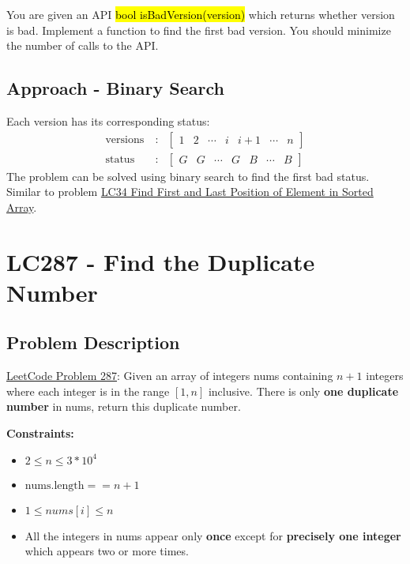 \documentclass[justified]{tufte-book}
\begin{document}
You are given an API \hl{bool isBadVersion(version)} which returns whether version is bad. Implement a function to find the first bad version. You should minimize the number of calls to the API.

\subsection{Approach - Binary Search}
Each version has its corresponding status:
\begin{eqnarray*}
    \text{versions} ~ &:& \begin{bmatrix} 1 & 2 & \cdots & i & i+1 & \cdots & n \end{bmatrix} \\
    \text{status} ~ &:& \begin{bmatrix} G & G & \cdots & G & B & \cdots & B \end{bmatrix}
\end{eqnarray*}
The problem can be solved using binary search to find the first bad status. Similar to problem \hyperref[sec:lc34_find_first_last_position_sorted_array]{LC34 Find First and Last Position of Element in Sorted Array}.

\section{LC287 - Find the Duplicate Number} \label{sec:lc287_find_duplicate_number}
\subsection{Problem Description}
\href{https://leetcode.com/problems/find-the-duplicate-number/}{LeetCode Problem 287}: Given an array of integers nums containing $n + 1$ integers where each integer is in the range $[1, n]$ inclusive. There is only \textbf{one duplicate number} in nums, return this duplicate number. 

\noindent \textbf{Constraints:}
\begin{itemize}
    \item $2 \leq n \leq 3*10^4$
    \item $\text{nums.length} == n + 1$
    \item $1 \leq nums[i] \leq n$
    \item All the integers in nums appear only \textbf{once} except for \textbf{precisely one integer} which appears two or more times.
\end{itemize} 
\end{document}
